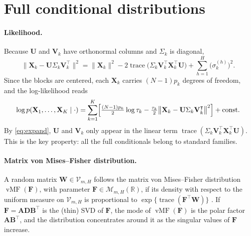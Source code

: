 \documentclass[11pt]{article}
\DeclareMathOperator{\trace}{trace}
\DeclareMathOperator{\vMF}{vMF}
\newcommand{\X}{\mathbf{X}}
\newcommand{\U}{\mathbf{U}}
\newcommand{\V}{\mathbf{V}}
\newcommand{\F}{\mathbf{F}}
\newcommand{\W}{\mathbf{W}}
\newcommand{\Stiefel}[2]{\mathcal V_{#1,#2}}
\begin{document}
\section{Full conditional distributions}

\paragraph{Likelihood.} Because $\U$ and $\V_k$ have orthonormal columns and $\Sigma_k$ is diagonal,
\begin{equation}
  \bigl\|\X_k-\U\Sigma_k\V_k^\intercal\bigr\|^2
  =\|\X_k\|^2-2\trace\bigl(\Sigma_k\V_k^\intercal\X_k^\intercal\U\bigr)+\sum_{h=1}^H\bigl(\sigma_k^{(h)}\bigr)^2 .
  \label{eq:expand}
\end{equation}
Since the blocks are centered, each $\X_k$ carries $(N-1)p_k$ degrees of freedom, and the log-likelihood reads
\[
  \log p(\X_1,\ldots,\X_K\mid\cdot)=\sum_{k=1}^K\Bigl[\tfrac{(N-1)p_k}{2}\log\tau_k
  -\tfrac{\tau_k}{2}\bigl\|\X_k-\U\Sigma_k\V_k^\intercal\bigr\|^2\Bigr]+\text{const}.
\]
By \eqref{eq:expand}, $\U$ and $\V_k$ only appear in the linear term $\trace(\Sigma_k\V_k^\intercal\X_k^\intercal\U)$.
This is the key property: all the full conditionals belong to standard families.

\paragraph{Matrix von Mises--Fisher distribution.} A random matrix $\W\in\Stiefel{m}{H}$ follows the matrix
von Mises--Fisher distribution $\vMF(\F)$, with parameter $\F\in\mathcal M_{m,H}(\mathbb R)$, if its density with
respect to the uniform measure on $\Stiefel{m}{H}$ is proportional to $\exp\{\trace(\F^\intercal\W)\}$
\cite{hoff2009}. If $\F=\mathbf A\mathbf D\mathbf B^\intercal$ is the (thin) SVD of $\F$, the mode of $\vMF(\F)$ is the
polar factor $\mathbf A\mathbf B^\intercal$, and the distribution concentrates around it as the singular values of $\F$ increase.
\end{document}
